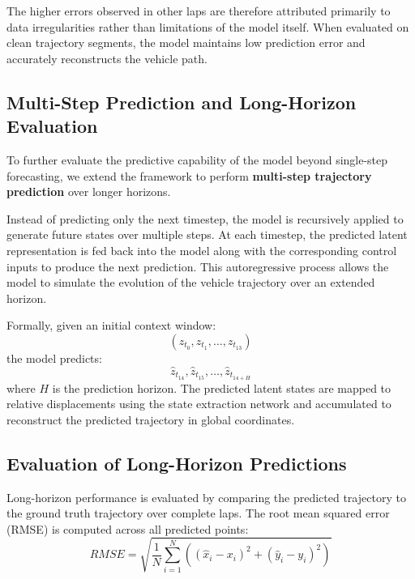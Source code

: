 \documentclass[preprint,12pt]{elsarticle}
\begin{document}
The higher errors observed in other laps are therefore attributed primarily to data irregularities rather than limitations of the model itself. When evaluated on clean trajectory segments, the model maintains low prediction error and accurately reconstructs the vehicle path.

\subsection{Multi-Step Prediction and Long-Horizon Evaluation }

To further evaluate the predictive capability of the model beyond single-step forecasting, we extend the framework to perform \textbf{multi-step trajectory prediction} over longer horizons.

Instead of predicting only the next timestep, the model is recursively applied to generate future states over multiple steps. At each timestep, the predicted latent representation is fed back into the model along with the corresponding control inputs to produce the next prediction. This autoregressive process allows the model to simulate the evolution of the vehicle trajectory over an extended horizon.

Formally, given an initial context window:
\begin{equation}
(z_{t_0}, z_{t_1}, \dots, z_{t_{13}})
\end{equation}
the model predicts:
\begin{equation}
\hat{z}_{t_{14}}, \hat{z}_{t_{15}}, \dots, \hat{z}_{t_{14+H}}
\end{equation}
where $H$ is the prediction horizon. The predicted latent states are mapped to relative displacements using the state extraction network and accumulated to reconstruct the predicted trajectory in global coordinates.

\subsection{Evaluation of Long-Horizon Predictions}

Long-horizon performance is evaluated by comparing the predicted trajectory to the ground truth trajectory over complete laps. The root mean squared error (RMSE) is computed across all predicted points:
\begin{equation}
RMSE = \sqrt{ \frac{1}{N} \sum_{i=1}^{N} \left( (\hat{x}_i - x_i)^2 + (\hat{y}_i - y_i)^2 \right) }
\end{equation}
\end{document}
